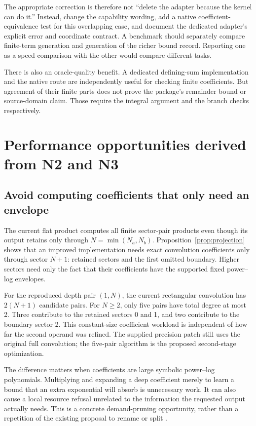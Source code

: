 \documentclass[11pt,letterpaper]{article}
\newcommand{\code}[1]{\texttt{\detokenize{#1}}}
\begin{document}
The appropriate correction is therefore not ``delete the adapter because the
kernel can do it.'' Instead, change the capability wording, add a native
coefficient-equivalence test for this overlapping case, and document the
dedicated adapter's explicit error and coordinate contract. A benchmark should
separately compare finite-term generation and generation of the richer bound
record. Reporting one as a speed comparison with the other would compare
different tasks.

There is also an oracle-quality benefit. A dedicated defining-sum implementation
and the native \code{Asymptotic} route are independently useful for checking
finite coefficients. But agreement of their finite parts does not prove the
package's remainder bound or source-domain claim. Those require the integral
argument and the branch checks respectively.

\section{Performance opportunities derived from N2 and N3}
\label{sec:performance}
\subsection{Avoid computing coefficients that only need an envelope}
The current flat product computes all finite sector-pair products even though
its output retains only through $N=\min(N_a,N_b)$. Proposition~\ref{prop:projection}
shows that an improved implementation needs exact convolution coefficients
only through sector $N+1$: retained sectors and the first omitted boundary.
Higher sectors need only the fact that their coefficients have the supported
fixed power--log envelopes.\cite{flatops}

For the reproduced depth pair $(1,N)$, the current rectangular convolution has
$2(N+1)$ candidate pairs. For $N\ge2$, only five pairs have total degree at most
2. Three contribute to the retained sectors 0 and 1, and two contribute to
the boundary sector 2. This constant-size coefficient workload is independent
of how far the second operand was refined. The supplied precision patch still
uses the original full convolution; the five-pair algorithm is the proposed
second-stage optimization.

The difference matters when coefficients are large symbolic power--log
polynomials. Multiplying and expanding a deep coefficient merely to learn a
bound that an extra exponential will absorb is unnecessary work. It can also
cause a local resource refusal unrelated to the information the requested
output actually needs. This is a concrete demand-pruning opportunity, rather
than a repetition of the existing proposal to rename or split \code{MaxTerms}.
\end{document}

